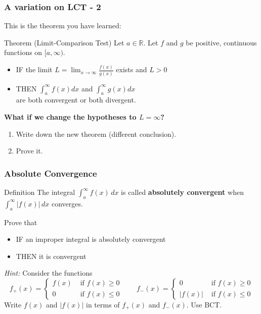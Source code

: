 \begin{frame}[t]
	\fontsize{12}{12}\selectfont
	\frametitle{A variation on LCT - 2}

	This is the theorem you have learned:
	\begin{block}{\fontsize{13}{13}\selectfont Theorem (Limit-Comparison Test)}
		Let $\displaystyle a \in \mathbb{R}$. Let $f$ and $g$ be positive, continuous
		functions on $\displaystyle [a, \infty)$.
		\begin{itemize}
			\item IF the limit \; $\displaystyle L = \lim_{x \to \infty}\frac{f(x)}{g(x)}$
				\; exists and \; $\displaystyle L>0$

			\item THEN $\displaystyle \int_{a}^{\infty}\! \! f(x) dx$ \; and \; $\displaystyle
				\int_{a}^{\infty}\! \! g(x) dx$ \\ are both convergent or both divergent.
		\end{itemize}
	\end{block}

	\vspace{.2cm}
	{\bfseries What if we change the hypotheses to $L=\infty$?}
	\begin{enumerate}
		\item Write down the new theorem (different conclusion).

		\item Prove it.
	\end{enumerate}
\end{frame}

\begin{frame}[t]
	\fontsize{12}{12}\selectfont
	\frametitle{Absolute Convergence}
	\vspace{-.3cm}

	\begin{block}{\fontsize{12}{12}\selectfont Definition}
		The integral $\displaystyle \int_{a}^{\infty}f(x)\, dx$ is called \textbf{absolutely
		convergent} when $\displaystyle \int_{a}^{\infty}|f(x)|\, dx$ converges.
	\end{block}

	Prove that
	\begin{itemize}
		\item IF an improper integral is absolutely convergent

		\item THEN it is convergent
	\end{itemize}

	\vspace{.5cm}

	\textit{Hint:} Consider the functions
	\[
		f_{+}(x) =
		\begin{cases}
			f(x) & \text{ if } f(x) \geq 0 \\
			0    & \text{ if } f(x) \leq 0
		\end{cases}
		\quad \quad f_{-}(x) =
		\begin{cases}
			0      & \text{ if }f(x) \geq 0 \\
			|f(x)| & \text{ if }f(x) \leq 0
		\end{cases}
	\]
	Write $f(x)$ and $|f(x)|$ in terms of $f_{+}(x)$ and $f_{-}(x)$. Use BCT.
\end{frame}

